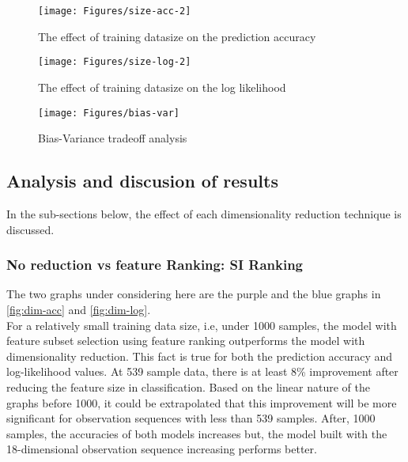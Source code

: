 \begin{figure}[ht!]
	\texttt{[image: Figures/size-acc-2]}
	\caption{The effect of training datasize on the prediction accuracy}
	\label{fig:size-acc}
\end{figure}

\begin{figure}[ht!]
	\texttt{[image: Figures/size-log-2]}
	\caption{The effect of training datasize on the log likelihood}
	\label{fig:size-log}
\end{figure}

\begin{figure}[ht!]
	\centering
	\texttt{[image: Figures/bias-var]}
	\caption{Bias-Variance tradeoff analysis}
	\label{fig:bias-var}
\end{figure}

\subsection{Analysis and discusion of results}
In the sub-sections below, the effect of each dimensionality reduction technique is discussed.
 
\subsubsection{No reduction vs feature Ranking: SI Ranking}
The two graphs under considering here are the purple and the blue graphs in \ref{fig:dim-acc} and \ref{fig:dim-log}. \\
For a relatively small training data size, i.e, under 1000 samples, the model with feature subset selection using feature ranking outperforms the model with dimensionality reduction. This fact is true for both the prediction accuracy and log-likelihood values. At 539 sample data, there is at least 8\% improvement after reducing the feature size in classification. Based on the linear nature of the graphs before 1000, it could be extrapolated that this improvement will be more significant for observation sequences with less than 539 samples.
After, 1000 samples, the accuracies of both models increases but, the model built with the 18-dimensional observation sequence increasing performs better.

